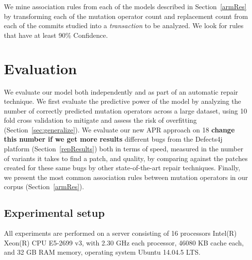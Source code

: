 \documentclass[conference]{IEEEtran}
\newcommand{\todo}[1]
  {{\scriptsize \textbf{\color{red} {#1}}}}
\begin{document}
We mine association rules from each of the models described in Section~\ref{armRes} by transforming each of the mutation operator count and replacement count from 
each of the commits studied into a \emph{transaction} to be analyzed. 
We look for rules that have at least 90\% Confidence.


\section{Evaluation} \label{evaluation}

We evaluate our model both independently and as part of an automatic repair
technique.  We first evaluate the predictive power of the model by analyzing the
number of correctly predicted mutation operators across a large dataset, using 10 fold cross
validation to mitigate and assess the risk of overfitting
(Section~\ref{sec:generalize}). We evaluate our new APR approach on 18 \todo{ change this number if we get more results} different bugs from the Defects4j platform (Section~\ref{repResults}) both in terms of speed, measured in the number of variants it takes to find a patch, and quality, by comparing against the patches created for these same bugs by other state-of-the-art repair techniques.  Finally, we present the most common 
association rules between mutation operators in our corpus
(Section~\ref{armRes}). 




\subsection{Experimental setup}
All experiments are performed on a server 
consisting of 16 processors Intel(R) Xeon(R) CPU E5-2699 v3, with 2.30 GHz each
processor, 46080 KB cache each, and 32 GB RAM memory, operating system Ubuntu 
14.04.5 LTS.
\end{document}
